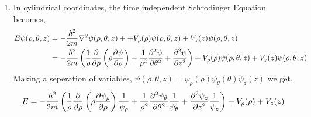 \documentclass[12pt]{extarticle}
\begin{document}
\begin{enumerate}
\item In cylindrical coordinates, the time independent Schrodinger Equation becomes, 
\begin{align*}
E \psi(\rho, \theta, z) &= -\frac{\hbar^2}{2m} \nabla^2 \psi(\rho, \theta, z) + + V_\rho(\rho)\psi(\rho, \theta, z)  +  V_z(z) \psi(\rho, \theta, z) \\ &= -\frac{\hbar^2}{2m} \left(\frac{1}{\rho} \frac{\partial{}}{\partial{\rho}}\left(\rho \frac{\partial{\psi}}{\partial{\rho}} \right) + \frac{1}{\rho^2} \frac{\partial^2{\psi}}{\partial{\theta}^2} + \frac{\partial^2{\psi}}{\partial{z}^2} \right) + V_\rho(\rho) \psi(\rho, \theta, z)  +  V_z(z) \psi(\rho, \theta, z) 
\end{align*}
Making a seperation of variables, $\psi(\rho, \theta, z) = \psi_\rho(\rho) \psi_\theta(\theta) \psi_z(z)$ we get, 
\[E = -\frac{\hbar^2}{2m} \left(\frac{1}{\rho}  \frac{\partial{}}{\partial{\rho}}\left(\rho \frac{\partial{\psi_\rho}}{\partial{\rho}} \right) \frac{1}{\psi_\rho} + \frac{1}{\rho^2} \frac{\partial^2{\psi_\theta}}{\partial{\theta}^2} \frac{1}{\psi_\theta} + \frac{\partial^2{\psi_z}}{\partial{z}^2} \frac{1}{\psi_z} \right) + V_\rho(\rho) +  V_z(z) \]


\end{enumerate}
\end{document}

